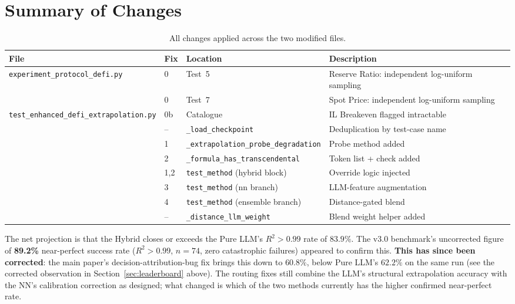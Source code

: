 \documentclass[twoside,11pt]{article}
\begin{document}
\section{Summary of Changes}
\label{sec:changes}

\begin{table}[h]
\centering
\caption{All changes applied across the two modified files.}
\label{tab:changes}
\begin{tabular}{llll}
\toprule
\textbf{File} & \textbf{Fix} & \textbf{Location} & \textbf{Description} \\
\midrule
\texttt{experiment\_protocol\_defi.py}
  & 0  & Test~5  & Reserve Ratio: independent log-uniform sampling \\
  & 0  & Test~7  & Spot Price: independent log-uniform sampling \\
\midrule
\texttt{test\_enhanced\_defi\_extrapolation.py}
  & 0b & Catalogue     & IL Breakeven flagged intractable \\
  & -- & \texttt{\_load\_checkpoint} & Deduplication by test-case name \\
  & 1  & \texttt{\_extrapolation\_probe\_degradation} & Probe method added \\
  & 2  & \texttt{\_formula\_has\_transcendental} & Token list + check added \\
  & 1,2& \texttt{test\_method} (hybrid block) & Override logic injected \\
  & 3  & \texttt{test\_method} (nn branch)     & LLM-feature augmentation \\
  & 4  & \texttt{test\_method} (ensemble branch) & Distance-gated blend \\
  & -- & \texttt{\_distance\_llm\_weight} & Blend weight helper added \\
\bottomrule
\end{tabular}
\end{table}

\bigskip
\noindent The net projection is that the Hybrid closes or exceeds the Pure
LLM's $R^2 > 0.99$ rate of $83.9\%$. The v3.0 benchmark's uncorrected
figure of \textbf{89.2\%} near-perfect success rate ($R^2>0.99$, $n=74$,
zero catastrophic failures) appeared to confirm this. \textbf{This has
since been corrected}: the main paper's decision-attribution-bug fix
brings this down to $60.8\%$, below Pure LLM's $62.2\%$ on the same run
(see the corrected observation in Section~\ref{sec:leaderboard} above).
The routing fixes still combine the LLM's structural extrapolation
accuracy with the NN's calibration correction as designed; what changed
is which of the two methods currently has the higher confirmed
near-perfect rate.
\end{document}
